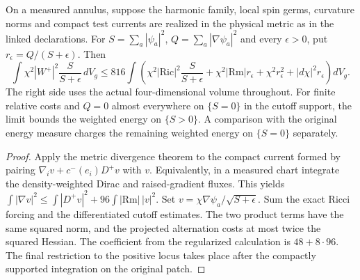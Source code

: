 \begin{proposition}
\label{prop:annular-spin-regularization}
\leanok
On a measured annulus, suppose the harmonic family, local spin germs,
curvature norms and compact test currents are realized in the physical
metric as in the linked declarations. For $S=\sum_a|\psi_a|^2$,
$Q=\sum_a|\nabla\psi_a|^2$ and every $\epsilon>0$, put
$r_\epsilon=Q/(S+\epsilon)$. Then
\[
 \int\chi^2|W^+|^2\frac S{S+\epsilon}\,dV_g
 \le 816\int\left(\chi^2|\mathrm{Ric}|^2\frac S{S+\epsilon}
 +\chi^2|\mathrm{Rm}|r_\epsilon+\chi^2r_\epsilon^2+
 |d\chi|^2r_\epsilon\right)dV_g .
\]
The right side uses the actual four-dimensional volume throughout.
For finite relative costs and $Q=0$ almost everywhere on
$\{S=0\}$ in the cutoff support, the limit bounds the weighted energy
on $\{S>0\}$. A comparison with the original energy measure charges
the remaining weighted energy on $\{S=0\}$ separately.
\end{proposition}
\begin{proof}
\leanok
Apply the metric divergence theorem to the compact current formed by
pairing $\nabla_i v+c^-(e_i)D^+v$ with $v$. Equivalently, in a measured
chart integrate the density-weighted Dirac and raised-gradient fluxes.
This yields $\int|\nabla v|^2\le\int|D^+v|^2+
96\int|\mathrm{Rm}|\,|v|^2$. Set $v=\chi\nabla\psi_a/\sqrt{S+\epsilon}$.
Sum the exact Ricci forcing and the differentiated cutoff estimates.
The two product terms have the same squared norm, and the
projected alternation costs at most twice the squared Hessian.
The coefficient from the regularized calculation is $48+8\cdot96$.
The final restriction to the positive locus takes place after the
compactly supported integration on the original patch.
\end{proof}

